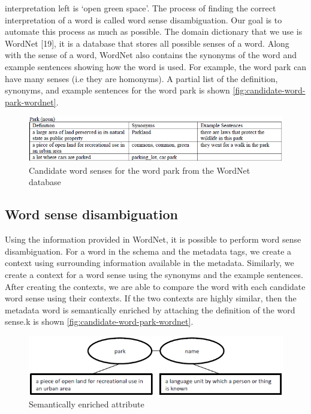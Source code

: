 interpretation left is `open green space'. The process of finding the correct interpretation of a word is called word sense disambiguation. Our goal is to automate this process as much as possible.
The domain dictionary that we use is WordNet \cite{Fellbaum1998Computers}[19], it is a database that stores all possible senses of a word. Along with the sense of a word, WordNet also contains the synonyms of the word and example sentences showing how the word is used. For example, the word park can have many senses (i.e they are homonyms). A partial list of the definition, synonyms, and example sentences for the word park is shown \autoref{fig:candidate-word-park-wordnet}.

\begin{figure}
    \centering
    \includegraphics[width=5in]{figures/candidate-word-park-wordnet.png}
    \caption{Candidate word senses for the word park from the WordNet database}
    \label{fig:candidate-word-park-wordnet}
\end{figure}

\subsection{Word sense disambiguation}

Using the information provided in WordNet, it is possible to perform word sense disambiguation. For a word in the schema and the metadata tags, we create a context using surrounding information available in the metadata. Similarly, we create a context for a word sense using the synonyms and the example sentences. After creating the contexts, we are able to compare the word with each candidate word sense using their contexts. If the two contexts are highly similar, then the metadata word is semantically enriched by attaching the definition of the word sense.k is shown \autoref{fig:candidate-word-park-wordnet}.

\begin{figure}
    \centering
    \includegraphics[width=5in]{figures/semantically-enriched-attribute.png}
    \caption{Semantically enriched attribute}
    \label{fig:semantically-enriched-attribute}
\end{figure}

